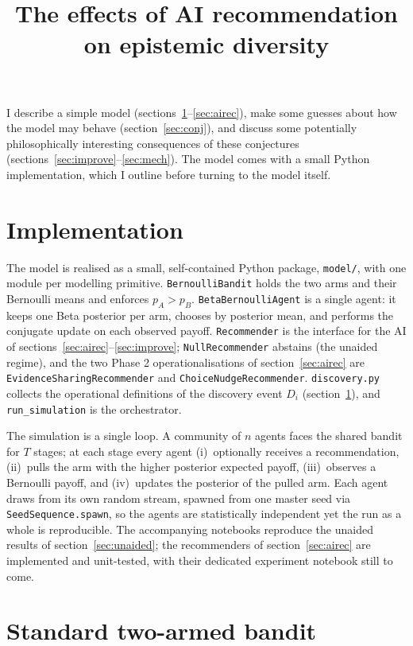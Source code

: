 \documentclass[12pt]{article}
\title{The effects of AI recommendation on epistemic diversity}
\author{}
\date{}
\begin{document}
\maketitle

I describe a simple model (sections~\ref{sec:bandit}--\ref{sec:airec}), make some guesses about how the model may behave (section~\ref{sec:conj}), and discuss some potentially philosophically interesting consequences of these conjectures (sections~\ref{sec:improve}--\ref{sec:mech}). The model comes with a small Python implementation, which I outline before turning to the model itself.

\section*{Implementation}

The model is realised as a small, self-contained Python package, \texttt{model/}, with one module per modelling primitive. \texttt{BernoulliBandit} holds the two arms and their Bernoulli means and enforces $p_A > p_B$. \texttt{BetaBernoulliAgent} is a single agent: it keeps one Beta posterior per arm, chooses by posterior mean, and performs the conjugate update on each observed payoff. \texttt{Recommender} is the interface for the AI of sections~\ref{sec:airec}--\ref{sec:improve}; \texttt{NullRecommender} abstains (the unaided regime), and the two Phase 2 operationalisations of section~\ref{sec:airec} are \texttt{EvidenceSharingRecommender} and \texttt{ChoiceNudgeRecommender}. \texttt{discovery.py} collects the operational definitions of the discovery event $D_i$ (section~\ref{sec:bandit}), and \texttt{run\_simulation} is the orchestrator.

The simulation is a single loop. A community of $n$ agents faces the shared bandit for $T$ stages; at each stage every agent (i)~optionally receives a recommendation, (ii)~pulls the arm with the higher posterior expected payoff, (iii)~observes a Bernoulli payoff, and (iv)~updates the posterior of the pulled arm. Each agent draws from its own random stream, spawned from one master seed via \texttt{SeedSequence.spawn}, so the agents are statistically independent yet the run as a whole is reproducible. The accompanying notebooks reproduce the unaided results of section~\ref{sec:unaided}; the recommenders of section~\ref{sec:airec} are implemented and unit-tested, with their dedicated experiment notebook still to come.

\section{Standard two-armed bandit}
\label{sec:bandit}
\end{document}
